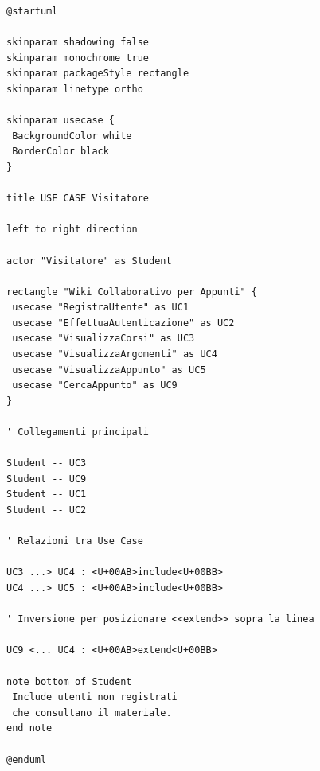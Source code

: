 \begin{verbatim}
@startuml

skinparam shadowing false
skinparam monochrome true
skinparam packageStyle rectangle
skinparam linetype ortho

skinparam usecase {
 BackgroundColor white
 BorderColor black
}

title USE CASE Visitatore

left to right direction

actor "Visitatore" as Student

rectangle "Wiki Collaborativo per Appunti" {
 usecase "RegistraUtente" as UC1
 usecase "EffettuaAutenticazione" as UC2
 usecase "VisualizzaCorsi" as UC3
 usecase "VisualizzaArgomenti" as UC4
 usecase "VisualizzaAppunto" as UC5
 usecase "CercaAppunto" as UC9
}

' Collegamenti principali

Student -- UC3
Student -- UC9
Student -- UC1
Student -- UC2

' Relazioni tra Use Case

UC3 ...> UC4 : <U+00AB>include<U+00BB>
UC4 ...> UC5 : <U+00AB>include<U+00BB>

' Inversione per posizionare <<extend>> sopra la linea

UC9 <... UC4 : <U+00AB>extend<U+00BB>

note bottom of Student
 Include utenti non registrati
 che consultano il materiale.
end note

@enduml
\end{verbatim}